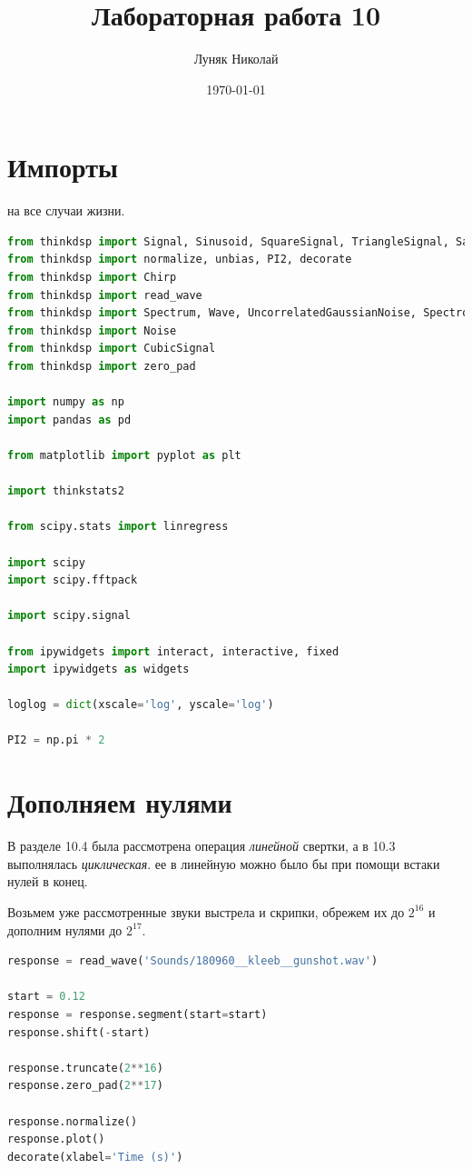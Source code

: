\documentclass[a4paper,12pt]{report}
\author{Луняк Николай}
\title{Лабораторная работа 10}
\date{\today}
\begin{document}
    \maketitle
    \tableofcontents
    \listoffigures
    \lstlistoflistings
    
    \chapter{Импорты}
    
     на все случаи жизни.
    
\begin{lstlisting}[language=Python,caption=Импорты]
from thinkdsp import Signal, Sinusoid, SquareSignal, TriangleSignal, SawtoothSignal, ParabolicSignal
from thinkdsp import normalize, unbias, PI2, decorate
from thinkdsp import Chirp
from thinkdsp import read_wave
from thinkdsp import Spectrum, Wave, UncorrelatedGaussianNoise, Spectrogram
from thinkdsp import Noise
from thinkdsp import CubicSignal
from thinkdsp import zero_pad

import numpy as np
import pandas as pd

from matplotlib import pyplot as plt

import thinkstats2

from scipy.stats import linregress

import scipy
import scipy.fftpack

import scipy.signal

from ipywidgets import interact, interactive, fixed
import ipywidgets as widgets

loglog = dict(xscale='log', yscale='log')

PI2 = np.pi * 2
\end{lstlisting}

    \chapter{Дополняем нулями}
    
    В разделе 10.4 была рассмотрена операция \emph{линейной} свертки, а в 10.3 выполнялась \emph{циклическая}.  ее в линейную можно было бы при помощи встаки нулей в конец. 
    
    Возьмем уже рассмотренные звуки выстрела и скрипки, обрежем их до $2^16$ и дополним нулями до $2^17$.
    
\begin{lstlisting}[language=Python,caption=Сигнал выстрела]
response = read_wave('Sounds/180960__kleeb__gunshot.wav')

start = 0.12
response = response.segment(start=start)
response.shift(-start)

response.truncate(2**16)
response.zero_pad(2**17)

response.normalize()
response.plot()
decorate(xlabel='Time (s)')
\end{lstlisting}
\end{document}

